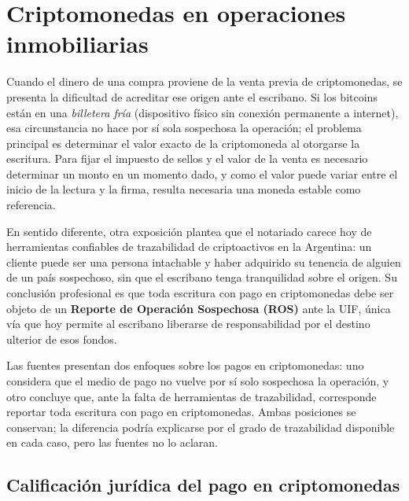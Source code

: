 \documentclass[12pt,oneside]{book}
\begin{document}
\section{Criptomonedas en operaciones inmobiliarias}
\label{sec:cripto-pbc}

Cuando el dinero de una compra proviene de la venta previa de criptomonedas, se presenta la dificultad de acreditar ese origen ante el escribano. Si los bitcoins están en una \emph{billetera fría} (dispositivo físico sin conexión permanente a internet), esa circunstancia no hace por sí sola sospechosa la operación; el problema principal es determinar el valor exacto de la criptomoneda al otorgarse la escritura. Para fijar el impuesto de sellos y el valor de la venta es necesario determinar un monto en un momento dado, y como el valor puede variar entre el inicio de la lectura y la firma, resulta necesaria una moneda estable como referencia.

En sentido diferente, otra exposición plantea que el notariado carece hoy de herramientas confiables de trazabilidad de criptoactivos en la Argentina: un cliente puede ser una persona intachable y haber adquirido su tenencia de alguien de un país sospechoso, sin que el escribano tenga tranquilidad sobre el origen. Su conclusión profesional es que toda escritura con pago en criptomonedas debe ser objeto de un \textbf{Reporte de Operación Sospechosa (ROS)} ante la UIF, única vía que hoy permite al escribano liberarse de responsabilidad por el destino ulterior de esos fondos.

\begin{note}
Las fuentes presentan dos enfoques sobre los pagos en criptomonedas: uno considera que el medio de pago no vuelve por sí solo sospechosa la operación, y otro concluye que, ante la falta de herramientas de trazabilidad, corresponde reportar toda escritura con pago en criptomonedas. Ambas posiciones se conservan; la diferencia podría explicarse por el grado de trazabilidad disponible en cada caso, pero las fuentes no lo aclaran.
\end{note}

\subsection{Calificación jurídica del pago en criptomonedas}
\end{document}
